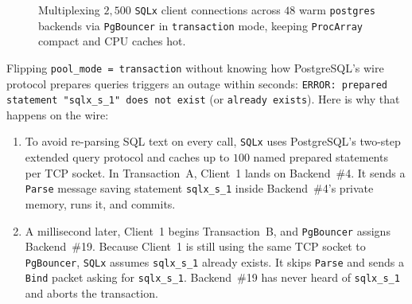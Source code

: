 \begin{figure}[H]
\caption{Multiplexing $2{,}500$ \texttt{SQLx} client connections across $48$ warm \texttt{postgres} backends via \texttt{PgBouncer} in \texttt{transaction} mode, keeping \texttt{ProcArray} compact and CPU caches hot.}
\label{ch08:fig-pgbouncer}
\end{figure}

Flipping \texttt{pool\_mode = transaction} without knowing how PostgreSQL's wire
protocol prepares queries triggers an outage within seconds:
\texttt{ERROR: prepared statement "sqlx\_s\_1" does not exist} (or
\texttt{already exists}). Here is why that happens on the wire:

\begin{enumerate}
  \item To avoid re-parsing SQL text on every call, \texttt{SQLx} uses PostgreSQL's
    two-step extended query protocol and caches up to $100$ named prepared
    statements per TCP socket. In Transaction~A, Client~1 lands on Backend~\#4. It
    sends a \texttt{Parse} message saving statement \texttt{sqlx\_s\_1} inside
    Backend~\#4's private memory, runs it, and commits.
  \item A millisecond later, Client~1 begins Transaction~B, and \texttt{PgBouncer}
    assigns Backend~\#19. Because Client~1 is still using the same TCP socket to
    \texttt{PgBouncer}, \texttt{SQLx} assumes \texttt{sqlx\_s\_1} already exists. It
    skips \texttt{Parse} and sends a \texttt{Bind} packet asking for
    \texttt{sqlx\_s\_1}. Backend~\#19 has never heard of \texttt{sqlx\_s\_1} and
    aborts the transaction.
\end{enumerate}

